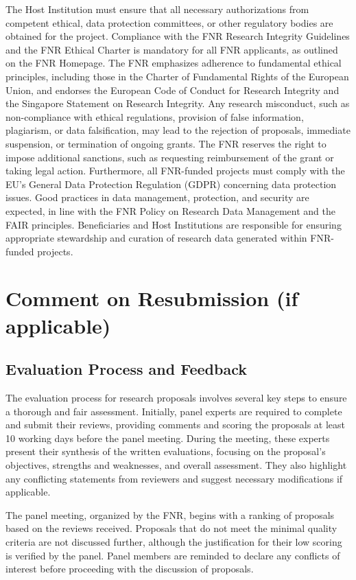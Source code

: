 \documentclass[12pt]{article}
\begin{document}
The Host Institution must ensure that all necessary authorizations from competent ethical, data protection committees, or other regulatory bodies are obtained for the project. Compliance with the FNR Research Integrity Guidelines and the FNR Ethical Charter is mandatory for all FNR applicants, as outlined on the FNR Homepage. The FNR emphasizes adherence to fundamental ethical principles, including those in the Charter of Fundamental Rights of the European Union, and endorses the European Code of Conduct for Research Integrity and the Singapore Statement on Research Integrity. Any research misconduct, such as non-compliance with ethical regulations, provision of false information, plagiarism, or data falsification, may lead to the rejection of proposals, immediate suspension, or termination of ongoing grants. The FNR reserves the right to impose additional sanctions, such as requesting reimbursement of the grant or taking legal action. Furthermore, all FNR-funded projects must comply with the EU’s General Data Protection Regulation (GDPR) concerning data protection issues. Good practices in data management, protection, and security are expected, in line with the FNR Policy on Research Data Management and the FAIR principles. Beneficiaries and Host Institutions are responsible for ensuring appropriate stewardship and curation of research data generated within FNR-funded projects.

\section{Comment on Resubmission (if applicable)}

\subsection{Evaluation Process and Feedback}

The evaluation process for research proposals involves several key steps to ensure a thorough and fair assessment. Initially, panel experts are required to complete and submit their reviews, providing comments and scoring the proposals at least 10 working days before the panel meeting. During the meeting, these experts present their synthesis of the written evaluations, focusing on the proposal's objectives, strengths and weaknesses, and overall assessment. They also highlight any conflicting statements from reviewers and suggest necessary modifications if applicable.

The panel meeting, organized by the FNR, begins with a ranking of proposals based on the reviews received. Proposals that do not meet the minimal quality criteria are not discussed further, although the justification for their low scoring is verified by the panel. Panel members are reminded to declare any conflicts of interest before proceeding with the discussion of proposals.
\end{document}
